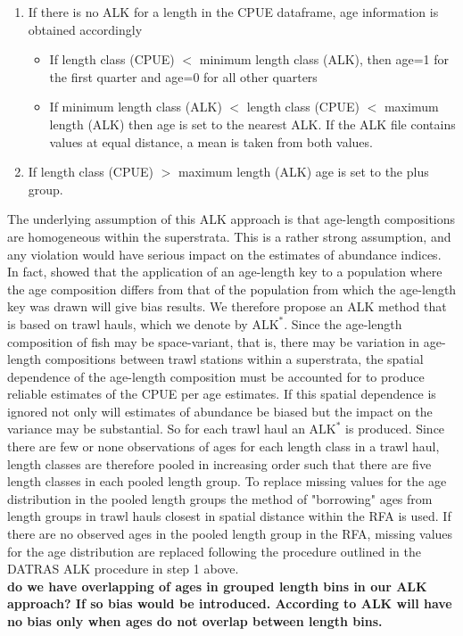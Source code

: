 \documentclass[a4paper 12pt]{article}
\numberwithin{equation}{section}
\begin{document}
\begin{enumerate}
\item If there is no ALK for a length in the CPUE dataframe, age information is obtained accordingly
\begin{itemize}
\item If length class (CPUE) $<$ minimum length class (ALK), then age=1 for the first quarter and age=0 for all other quarters
\item  If minimum length class (ALK) $<$ length class (CPUE) $<$ maximum length (ALK) then age is set to the nearest ALK. If the ALK file contains values at equal distance, a mean is taken from both values. 
\end{itemize}

\item If length class (CPUE) $>$ maximum length (ALK) age is set to the plus group.
\end{enumerate}
The underlying assumption of this ALK approach is that age-length compositions are homogeneous within the superstrata. This is a rather strong assumption, and any violation would have serious impact on the estimates of abundance indices. In fact, \citet{kimura1977statistical} showed that the application of an age-length key  to a population where the age composition differs from that of the population from which the age-length key was drawn will give bias results. We therefore propose an ALK method that is based on trawl hauls, which we denote by $\mathrm{ALK}^{*}$. Since the age-length composition of fish may be space-variant, that is, there may be variation in age-length compositions between trawl stations within a superstrata, the spatial dependence of the age-length composition must be accounted for to produce reliable estimates of the CPUE per age estimates. If this spatial dependence is ignored not only will estimates of abundance be biased but the impact on the variance may be substantial. So for each trawl haul an $\mathrm{ALK}^{*}$ is produced. Since there are few or none observations of ages for each length class in a trawl haul, length classes are therefore pooled in increasing order such that there are five length classes in each pooled length group. To replace missing values for the age distribution in the pooled length groups the method of "borrowing" ages from length groups in trawl hauls closest in spatial distance within the RFA is used. If there are no observed ages in the pooled length group in the RFA, missing values for the age distribution are replaced following the procedure outlined in the DATRAS ALK procedure in step 1 above.  \\
 {\bf do we have overlapping of ages in grouped length bins in our ALK approach? If so bias would be introduced. According to \citet{westrheim1978bias} ALK will have no bias only when ages do not overlap between length bins.}
 
\end{document}
